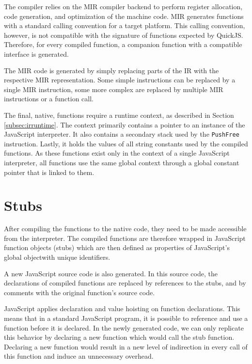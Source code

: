 The compiler relies on the MIR compiler backend to perform register allocation, code generation, and optimization of the machine code. MIR generates functions with a standard calling convention for a target platform. This calling convention, however, is not compatible with the signature of functions expected by QuickJS. Therefore, for every compiled function, a companion function with a compatible interface is generated.

The MIR code is generated by simply replacing parts of the IR with the respective MIR representation. Some simple instructions can be replaced by a single MIR instruction, some more complex are replaced by multiple MIR instructions or a function call.

The final, native, functions require a runtime context, as described in Section \ref{subsec:irruntime}. The context primarily contains a pointer to an instance of the JavaScript interpreter. It also contains a secondary stack used by the \texttt{PushFree} instruction. Lastly, it holds the values of all string constants used by the compiled functions. As these functions exist only in the context of a single JavaScript interpreter, all functions use the same global context through a global constant pointer that is linked to them.


\section{Stubs}\label{stubs}

After compiling the functions to the native code, they need to be made accessible from the interpreter. The compiled functions are therefore wrapped in JavaScript function objects (stubs) which are then defined as properties of JavaScript's global object\footnotemark[1] with unique identifiers.


A new JavaScript source code is also generated. In this source code, the declarations of compiled functions are replaced by references to the stubs, and by comments with the original function's source code.

JavaScript applies declaration and value hoisting on function declarations. This means that in a standard JavaScript program, it is possible to reference and use a function before it is declared. In the newly generated code, we can only replicate this behavior by declaring a new function which would call the stub function. Declaring a new function would result in a new level of indirection in every call of this function and induce an unnecessary overhead.

